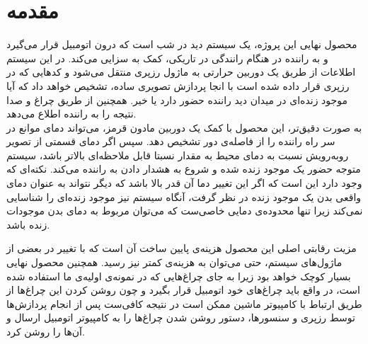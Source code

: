 \chapter{مقدمه}
محصول نهایی این پروژه، یک سیستم دید در شب است که درون اتومبیل قرار می‌گیرد و به راننده در هنگام رانندگی در تاریکی، کمک به سزایی می‌کند. در این سیستم اطلاعات از طریق یک دوربین حرارتی به ماژول رزپری منتقل می‌شود و کدهایی که در رزپری قرار داده شده است با انجا پردازش تصویری ساده، تشخیص خواهد داد که آیا موجود زنده‌ای در میدان دید راننده حضور دارد یا خیر. همچنین از طریق چراغ و صدا نتیجه را به راننده اطلاع می‌دهد.
\\

به صورت دقیق‌تر، این محصول با کمک یک دوربین مادون قرمز، می‌تواند دمای موانع در سر راه راننده را از فاصله‌ی دور تشخیص دهد. سپس اگر دمای قسمتی از تصویر روبه‌رویش نسبت به دمای محیط به مقدار نسبتا قابل ملاحظه‌ای بالاتر باشد، سیستم متوجه حضور یک موجود زنده شده و شروع به هشدار دادن به راننده می‌کند. نکته‌ای که وجود دارد این است که اگر این تغییر دما آن قدر بالا باشد که دیگر نتواند به عنوان دمای واقعی بدن یک موجود زنده در نظر گرفت، آنگاه سیستم نیز موجود زنده‌ای را شناسایی نمی‌کند زیرا تنها محدوده‌ی دمایی خاصی‌ست که می‌توان مربوط به دمای بدن موجودات زنده باشد.

مزیت رقابتی اصلی این محصول هزینه‌ی پایین ساخت آن است که با تغییر در بعضی از ماژول‌های سیستم، حتی می‌توان به هزینه‌ی کمتر نیز رسید. همچنین محصول نهایی بسیار کوچک خواهد بود زیرا به جای چراغ‌هایی که در نمونه‌ی اولیه‌ی ما استفاده شده است، در واقع باید چرا‌غ‌های خود اتومبیل قرار بگیرد و چون روشن کردن این چراغ‌ها از طریق ارتباط با کامپیوتر ماشین ممکن است در نتیجه کافی‌ست پس از انجام پردازش‌ها توسط رزپری و سنسور‌ها، دستور روشن شدن چراغ‌ها را به کامپیوتر اتومبیل ارسال و آن‌ها را روشن کرد.